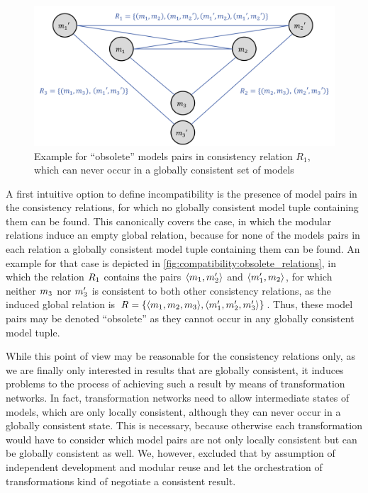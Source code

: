 \begin{figure}
    \centering
    \includegraphics[width=\textwidth]{figures/correctness/compatibility/obsolete_relations.png}
    \caption[Example for obsolete elements in consistency relations]{Example for \enquote{obsolete} models pairs in consistency relation $R_1$, which can never occur in a globally consistent set of models}
    \label{fig:compatibility:obsolete_relations}
\end{figure}

A first intuitive option to define incompatibility is the presence of model pairs in the consistency relations, for which no globally consistent model tuple containing them can be found.
This canonically covers the case, in which the modular relations induce an empty global relation, because for none of the models pairs in each relation a globally consistent model tuple containing them can be found.
An example for that case is depicted in \autoref{fig:compatibility:obsolete_relations}, in which the relation $R_{1}$ contains the pairs $\langle m_{1}, m_{2}' \rangle$ and $\langle m_{1}', m_{2} \rangle$, for which neither $m_{3}$ nor $m_{3}'$ is consistent to both other consistency relations, as the induced global relation is $R_{} = \{ \langle m_{1},m_{2},m_{3} \rangle,\langle m_{1}',m_{2}',m_{3}' \rangle \}$.
Thus, these model pairs may be denoted \enquote{obsolete} as they cannot occur in any globally consistent model tuple.

While this point of view may be reasonable for the consistency relations only, as we are finally only interested in results that are globally consistent, it induces problems to the process of achieving such a result by means of transformation networks.
In fact, transformation networks need to allow intermediate states of models, which are only locally consistent, although they can never occur in a globally consistent state.
This is necessary, because otherwise each transformation would have to consider which model pairs are not only locally consistent but can be globally consistent as well.
We, however, excluded that by assumption of independent development and modular reuse and let the orchestration of transformations kind of negotiate a consistent result.

